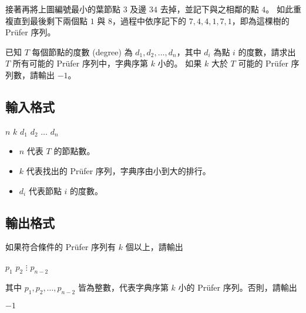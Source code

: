 \noindent 接著再將上圖編號最小的葉節點 \(3\) 及邊 \(34\)
去掉，並記下與之相鄰的點 \(4\)。 如此重複直到最後剩下兩個點 \(1\) 與
\(8\)，過程中依序記下的 \(7, 4, 4, 1, 7, 1\)，即為這棵樹的 Prüfer 序列。

\begin{figure}[h]
   \centering
\end{figure}

已知 \(T\) 每個節點的度數 (degree) 為 \(d_1, d_2, \ldots, d_n\)，其中
\(d_i\) 為點 \(i\) 的度數，請求出 \(T\) 所有可能的 Prüfer
序列中，字典序第 \(k\) 小的。 如果 \(k\) 大於 \(T\) 可能的 Prüfer
序列數，請輸出 \(-1\)。

\subsection{輸入格式}

\begin{format}
\f{
$n$ $k$
$d_1$ $d_2$ $\ldots$ $d_n$
}
\end{format}

\begin{itemize}
\tightlist
\item
  \(n\) 代表 \(T\) 的節點數。
\item
  \(k\) 代表找出的 Prüfer 序列，字典序由小到大的排行。
\item
  \(d_i\) 代表節點 \(i\) 的度數。
\end{itemize}

\subsection{輸出格式}

如果符合條件的 Prüfer 序列有 \(k\) 個以上，請輸出

\begin{format}
\f{
$p_1$
$p_2$
$\vdots$
$p_{n-2}$
}
\end{format}

其中 \(p_1, p_2, \ldots, p_{n-2}\) 皆為整數，代表字典序第 \(k\) 小的
Prüfer 序列。否則，請輸出

\begin{format}
\f{
$-1$
}
\end{format}

